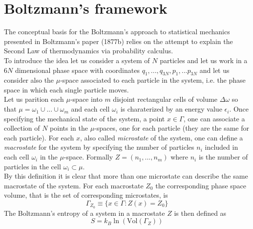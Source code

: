 \section{Boltzmann's framework}
The conceptual basis for the Boltzmann's approach to statistical mechanics presented in Boltzmann's paper (1877b) relies on the attempt to explain the Second Law of thermodynamics via probability calculus. \\
To introduce the idea let us consider a system of $N$ particles and let us work in a $6N$ dimensional phase space with coordinates $q_1,...,q_{3N}, p_1, ... p_{3N}$ and let us consider also the $\mu$-space associated to each particle in the system, i.e. the phase space in which each single particle moves. \\
Let us parition each $\mu$-space into $m$ disjoint rectangular cells of volume $\Delta\omega$ so that $\mu = \omega_1 \cup ... \cup \omega_m$ and each cell $\omega_i$ is charaterized by an energy value $\epsilon_i$. Once specifying the mechanical state of the system, a point $x \in \Gamma$, one can 
associate a collection of $N$ points in the $\mu$-spaces, one for each particle (they are the same for each particle). For each $x$, also called \emph{microstate} of the system, one can define a \emph{macrostate} for the system by specifying the number of particles $n_i$ included in each cell $\omega_i$ in the $\mu$-space. 
Formally $Z = (n_1, ... , n_m)$ where $n_i$ is the number of particles in the cell $\omega_i \subset \mu$. \\
By this definition it is clear that more than one microstate can describe the same macrostate of the system. For each macrostate $Z_0$ the corresponding phase space volume, that is the set of corresponding microstates, is 
\begin{equation*}
    \Gamma_{Z_0} \equiv \{x \in \Gamma : Z(x) = Z_0\}
\end{equation*}
The Boltzmann's entropy of a system in a macrostate $Z$ is then defined as
\begin{equation}
    S = k_B \ln\left( \text{Vol}(\Gamma_Z)\right)
    \label{eq:Boltzmann_entropy}
\end{equation}


